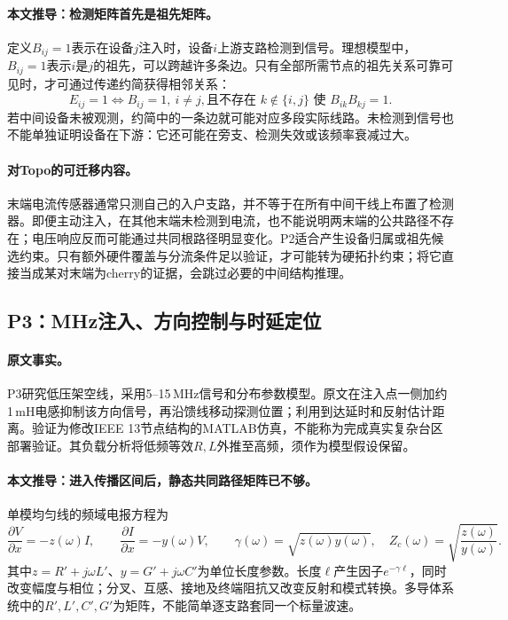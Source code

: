 \paragraph{本文推导：检测矩阵首先是祖先矩阵。}
定义$B_{ij}=1$表示在设备$j$注入时，设备$i$上游支路检测到信号。理想模型中，$B_{ij}=1$表示$i$是$j$的祖先，可以跨越许多条边。只有全部所需节点的祖先关系可靠可见时，才可通过传递约简获得相邻关系：
\begin{equation}
 E_{ij}=1
 \Longleftrightarrow
 B_{ij}=1,\ i\ne j,
 \text{且不存在 }k\notin\{i,j\}\text{ 使 }B_{ik}B_{kj}=1.
 \label{eq:p2-transitive-reduction}
\end{equation}
若中间设备未被观测，约简中的一条边就可能对应多段实际线路。未检测到信号也不能单独证明设备在下游：它还可能在旁支、检测失效或该频率衰减过大。

\paragraph{对Topo的可迁移内容。}
末端电流传感器通常只测自己的入户支路，并不等于在所有中间干线上布置了检测器。即便主动注入，在其他末端未检测到电流，也不能说明两末端的公共路径不存在；电压响应反而可能通过共同根路径明显变化。P2适合产生设备归属或祖先候选约束。只有额外硬件覆盖与分流条件足以验证，才可能转为硬拓扑约束；将它直接当成某对末端为cherry的证据，会跳过必要的中间结构推理。

\subsection{P3：MHz注入、方向控制与时延定位}
\label{subsec:P3}

\paragraph{原文事实。}
P3\citep{P3}研究低压架空线，采用5--15\,MHz信号和分布参数模型。原文在注入点一侧加约1\,mH电感抑制该方向信号，再沿馈线移动探测位置；利用到达延时和反射估计距离。验证为修改IEEE 13节点结构的MATLAB仿真，不能称为完成真实复杂台区部署验证。其负载分析将低频等效$R,L$外推至高频，须作为模型假设保留。

\paragraph{本文推导：进入传播区间后，静态共同路径矩阵已不够。}
单模均匀线的频域电报方程为
\begin{equation}
 \frac{\partial V}{\partial x}=-z(\omega)I,\qquad
 \frac{\partial I}{\partial x}=-y(\omega)V,
 \qquad
 \gamma(\omega)=\sqrt{z(\omega)y(\omega)},\quad
 Z_c(\omega)=\sqrt{\frac{z(\omega)}{y(\omega)}}.
 \label{eq:p3-telegrapher}
\end{equation}
其中$z=R'+j\omega L'$、$y=G'+j\omega C'$为单位长度参数。长度$\ell$产生因子$e^{-\gamma\ell}$，同时改变幅度与相位；分叉、互感、接地及终端阻抗又改变反射和模式转换。多导体系统中的$R',L',C',G'$为矩阵，不能简单逐支路套同一个标量波速。

